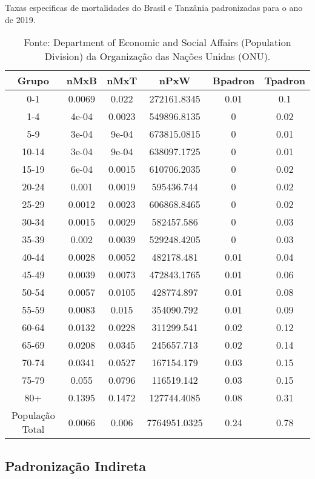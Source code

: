 \begin{table}[H]
\centering
\captionsetup{justification=raggedright,singlelinecheck=false}
  \caption{Taxas especificas de mortalidades do Brasil e Tanzânia padronizadas para o ano de 2019.}
  \label{tab:dfPadDir}
\begin{tabular}{cccccc}
\toprule
Grupo & nMxB & nMxT & nPxW & Bpadron & Tpadron \\
\midrule
0-1 & 0.0069 & 0.022 & 272161.8345 & 0.01 & 0.1 \\
1-4 & 4e-04 & 0.0023 & 549896.8135 & 0 & 0.02 \\
5-9 & 3e-04 & 9e-04 & 673815.0815 & 0 & 0.01 \\
10-14 & 3e-04 & 9e-04 & 638097.1725 & 0 & 0.01 \\
15-19 & 6e-04 & 0.0015 & 610706.2035 & 0 & 0.02 \\
20-24 & 0.001 & 0.0019 & 595436.744 & 0 & 0.02 \\
25-29 & 0.0012 & 0.0023 & 606868.8465 & 0 & 0.02 \\
30-34 & 0.0015 & 0.0029 & 582457.586 & 0 & 0.03 \\
35-39 & 0.002 & 0.0039 & 529248.4205 & 0 & 0.03 \\
40-44 & 0.0028 & 0.0052 & 482178.481 & 0.01 & 0.04 \\
45-49 & 0.0039 & 0.0073 & 472843.1765 & 0.01 & 0.06 \\
50-54 & 0.0057 & 0.0105 & 428774.897 & 0.01 & 0.08 \\
55-59 & 0.0083 & 0.015 & 354090.792 & 0.01 & 0.09 \\
60-64 & 0.0132 & 0.0228 & 311299.541 & 0.02 & 0.12 \\
65-69 & 0.0208 & 0.0345 & 245657.713 & 0.02 & 0.14 \\
70-74 & 0.0341 & 0.0527 & 167154.179 & 0.03 & 0.15 \\
75-79 & 0.055 & 0.0796 & 116519.142 & 0.03 & 0.15 \\
80+ & 0.1395 & 0.1472 & 127744.4085 & 0.08 & 0.31 \\
População Total & 0.0066 & 0.006 & 7764951.0325 & 0.24 & 0.78 \\
\bottomrule
\end{tabular}
\caption*{Fonte: Department of Economic and Social Affairs (Population Division) da Organização das Nações Unidas (ONU).}
\end{table}



\subsection{Padronização Indireta}

